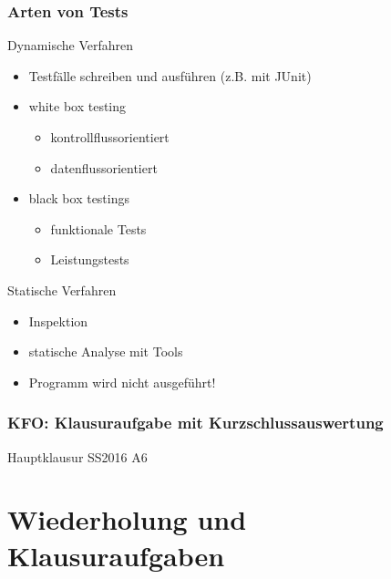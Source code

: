 \documentclass[18pt]{beamer}
\begin{document}
	\begin{frame}
		\frametitle{Arten von Tests}
		\begin{block}{Dynamische Verfahren}
			\begin{itemize}
				\item Testfälle schreiben und ausführen (z.B. mit JUnit) \pause
				\item white box testing \pause
				\begin{itemize}
					\item kontrollflussorientiert
					\item datenflussorientiert
				\end{itemize}
				\item black box testings \pause
				\begin{itemize}
					\item funktionale Tests \pause
					\item Leistungstests
				\end{itemize}
			\end{itemize}
		\end{block}
		\pause
		\begin{block}{Statische Verfahren}
			\begin{itemize}
				\item Inspektion \pause
				\item statische Analyse mit Tools \pause
				\item Programm wird nicht ausgeführt!
			\end{itemize}
		\end{block}
	\end{frame}


	\begin{frame}
		\frametitle{KFO: Klausuraufgabe mit Kurzschlussauswertung}
		\begin{huge}
			\centering Hauptklausur SS2016 A6
		\end{huge}
	\end{frame}

\section{Wiederholung und Klausuraufgaben}
\end{document}
